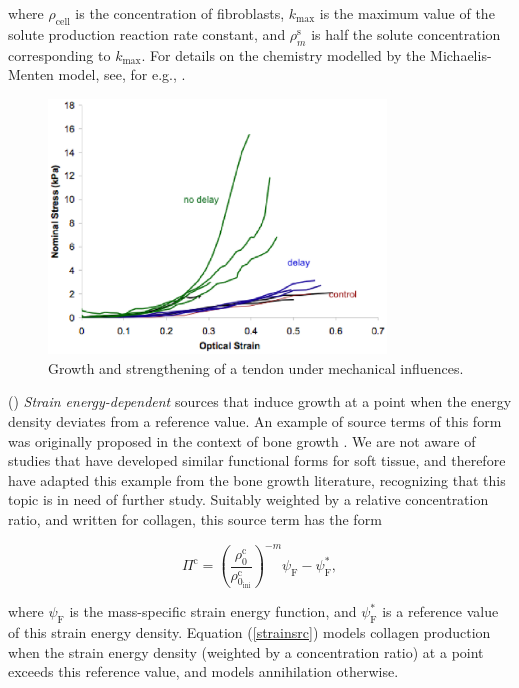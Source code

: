 \noindent where $\rho_{\mathrm{cell}}$ is the concentration of
fibroblasts, $k_{\mathrm{max}}$ is the maximum value of the solute
production reaction rate constant, and $\rho^{\mathrm{s}}_m$ is half
the solute concentration corresponding to $k_{\mathrm{max}}$. For
details on the chemistry modelled by the Michaelis-Menten model, see,
for e.g., \citet{sbromadill}.

\begin{figure}[!hpt]
\centering
\includegraphics[width=0.8\textwidth]
                {images/experiments/load-strengthening} 
\caption{Growth and strengthening of a tendon under mechanical influences.}
\label{load-strengthening}
\end{figure}

() {\em Strain energy-dependent} sources that
induce growth at a point when the 
energy density deviates from a reference value. An example of source terms
of this form was
originally proposed in the context of bone growth 
\citep{HarriganHamilton:93}. We are not aware of studies that have
developed similar functional forms for soft tissue, and therefore have
adapted this example from the bone growth literature, recognizing that
this topic is in need of further study. Suitably weighted by a
relative concentration ratio, and written for collagen, this source
term has the form 

\begin{equation}
\Pi^\mathrm{c} =
\left(\frac{\rho^\mathrm{c}_0}{\rho^\mathrm{c}_{0_\mathrm{ini}}}\right)^{-m}
\psi_{\mathrm{F}}-\psi_{\mathrm{F}}^*,
\label{strainsrc}
\end{equation}

\noindent where $\psi_{\mathrm{F}}$ is the mass-specific strain energy
function, and $\psi_{\mathrm{F}}^*$ is a reference value of this
strain energy density. Equation (\ref{strainsrc}) models collagen
production when the strain energy density (weighted by a concentration
ratio) at a point exceeds this reference value, and models 
annihilation otherwise.

